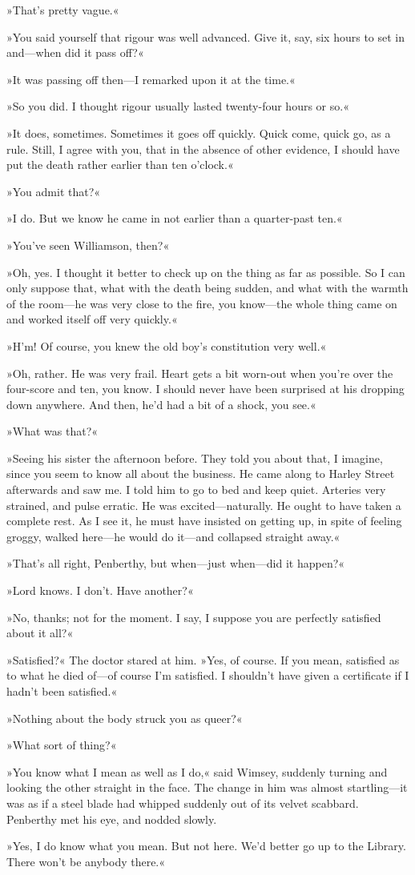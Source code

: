 »That's pretty vague.«

»You said yourself that rigour was well advanced. Give it, say, six hours to set in and—when did it pass off?«

»It was passing off then—I remarked upon it at the time.«

»So you did. I thought rigour usually lasted twenty-four hours or so.«

»It does, sometimes. Sometimes it goes off quickly. Quick come, quick go, as a rule. Still, I agree with you, that in the absence of other evidence, I should have put the death rather earlier than ten o'clock.«

»You admit that?«

»I do. But we know he came in not earlier than a quarter-past ten.«

»You've seen Williamson, then?«

»Oh, yes. I thought it better to check up on the thing as far as possible. So I can only suppose that, what with the death being sudden, and what with the warmth of the room—he was very close to the fire, you know—the whole thing came on and worked itself off very quickly.«

»H'm! Of course, you knew the old boy's constitution very well.«

»Oh, rather. He was very frail. Heart gets a bit worn-out when you're over the four-score and ten, you know. I should never have been surprised at his dropping down anywhere. And then, he'd had a bit of a shock, you see.«

»What was that?«

»Seeing his sister the afternoon before. They told you about that, I imagine, since you seem to know all about the business. He came along to Harley Street afterwards and saw me. I told him to go to bed and keep quiet. Arteries very strained, and pulse erratic. He was excited—naturally. He ought to have taken a complete rest. As I see it, he must have insisted on getting up, in spite of feeling groggy, walked here—he would do it—and collapsed straight away.«

»That's all right, Penberthy, but when—just when—did it happen?«

»Lord knows. I don't. Have another?«

»No, thanks; not for the moment. I say, I suppose you are perfectly satisfied about it all?«

»Satisfied?« The doctor stared at him. »Yes, of course. If you mean, satisfied as to what he died of—of course I'm satisfied. I shouldn't have given a certificate if I hadn't been satisfied.«

»Nothing about the body struck you as queer?«

»What sort of thing?«

»You know what I mean as well as I do,« said Wimsey, suddenly turning and looking the other straight in the face. The change in him was almost startling—it was as if a steel blade had whipped suddenly out of its velvet scabbard. Penberthy met his eye, and nodded slowly.

»Yes, I do know what you mean. But not here. We'd better go up to the Library. There won't be anybody there.«